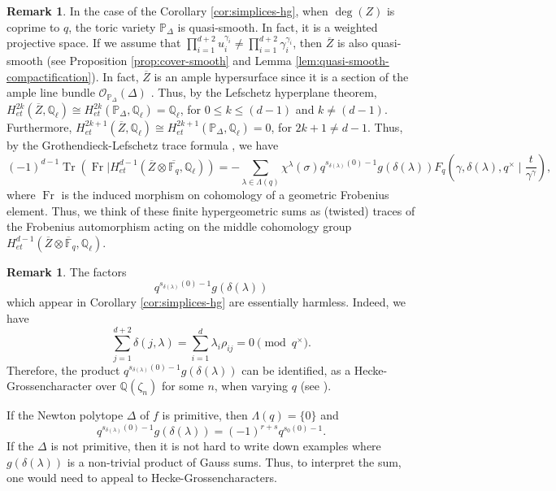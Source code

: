 \documentclass[11pt, reqno]{amsart}
\theoremstyle{plain}
\theoremstyle{definition}
\newtheorem{rem}[theo]{Remark}
\newcommand{\Ps}{\mathbb{P}}
\newcommand{\Q}{\mathbb{Q}}
\newcommand{\OO}{\mathcal{O}}
\newcommand{\F}{\mathbb{F}}
\begin{document}
\begin{rem}
In the case of the Corollary \ref{cor:simplices-hg}, when $\deg(Z)$ is coprime to $q$, the toric variety $\Ps_{\Delta}$ is quasi-smooth. In fact, it is a weighted projective space. If we assume that $\prod_{i=1}^{d+2}u_i^{\gamma_i} \neq \prod_{i=1}^{d+2} \gamma_i^{\gamma_i}$, then $\overline{Z}$ is also quasi-smooth (see Proposition \ref{prop:cover-smooth} and Lemma \ref{lem:quasi-smooth-compactification}). 
In fact, $\overline{Z}$ is an ample hypersurface since it is a section of the ample line bundle $\OO_{\Ps_\Delta}(\Delta)$ \cite{Danilov-geometry-of-toric}. 
Thus, by the Lefschetz hyperplane theorem, 
$H^{2k}_{et}(\overline{Z}, \mathbb{Q}_\ell) \cong H^{2k}_{et}(\Ps_{\Delta}, \mathbb{Q}_\ell) =\Q_\ell$,  for $0\le k \le (d-1)$ and $k \neq (d-1)$.
Furthermore, $H^{2k+1}_{et}(\overline{Z}, \mathbb{Q}_\ell) \cong H^{2k+1}_{et}(\Ps_{\Delta}, \mathbb{Q}_\ell) =0$, for $ 2k+1 \neq d-1$.
Thus, by the Grothendieck-Lefschetz trace formula \cite{grothendieck-lefschetz-stacks}, we have
\[
(-1)^{d-1}\operatorname{Tr} ( \operatorname{Fr} | H^{d-1}_{et}(\overline{Z} \otimes \overline{\F_q},\mathbb{Q}_\ell)) =  -\sum_{\lambda \in \Lambda(q)} \chi^{\lambda}(\sigma) q^{s_{\delta(\lambda)}(0)-1} g(\delta(\lambda))  F_q\left(\gamma,\delta(\lambda),q^\times \mid \frac{t}{\gamma^\gamma}\right),
\]
where $\operatorname{Fr}$ is the induced morphism on cohomology of a geometric Frobenius element.  
Thus, we think of these finite hypergeometric sums as (twisted) traces of the Frobenius automorphism acting on the middle cohomology group $H^{d-1}_{et}(\overline{Z}\otimes \overline{\F}_q, \Q_\ell)$.
\end{rem}
\begin{rem}\label{rem:hecke-grossen}
The factors
\[
q^{s_{\delta(\lambda)}(0)-1} g(\delta(\lambda)) 
\]
which appear in Corollary \ref{cor:simplices-hg} are essentially harmless. Indeed, we have 
\[
\sum_{j=1}^{d+2} \delta(j,\lambda) = \sum_{i=1}^d \lambda_i \rho_{ij}=0 \pmod{q^\times}.
\]
Therefore, the product $q^{s_{\delta(\lambda)}(0)-1} g(\delta(\lambda))$ can be identified, as a Hecke-Grossencharacter over $\Q(\zeta_n)$ for some $n$, when varying $q$ (see \cite[Theorem 4.3.4 and Remark 4.4.4]{voight-kelly}).

If the Newton polytope $\Delta$ of $f$ is primitive, then $\Lambda(q)=\{0\}$ and 
\[q^{s_{\delta(\lambda)}(0)-1} g(\delta(\lambda)) = (-1)^{r+s} q^{s_{0}(0)-1}.\]
If the $\Delta$ is not primitive, then it is not hard to write down examples where $g(\delta(\lambda))$ is a non-trivial product of Gauss sums. Thus, to interpret the sum, one would need to appeal to Hecke-Grossencharacters.
\end{rem}
\end{document}

